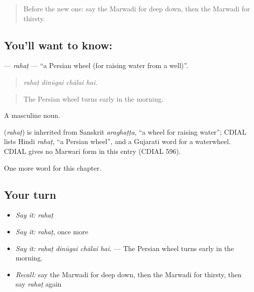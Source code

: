 \begin{quote}
Before the new one: say the Marwadi for deep down, then the Marwadi for thirsty.
\end{quote}

\subsection*{You'll want to know: }
\textbf{} — \emph{rahaṭ} — \textquotedblleft{}a Persian wheel (for raising water from a well)\textquotedblright{}.

\begin{quote}
   
\end{quote}

\begin{quote}
\emph{rahaṭ dinūgai chālai hai.}
\end{quote}

\begin{quote}
The Persian wheel turns early in the morning.
\end{quote}

A masculine noun.

\begin{cousinweb}
\textbf{} (\emph{rahaṭ}) is inherited from Sanskrit \emph{araghaṭṭa}, \textquotedblleft{}a wheel for raising water\textquotedblright{}; CDIAL lists Hindi \emph{rahaṭ}, \textquotedblleft{}a Persian wheel\textquotedblright{}, and a Gujarati word for a waterwheel. CDIAL gives no Marwari form in this entry (CDIAL 596).
\end{cousinweb}

\begin{grammarlens}[title={What you've built}]
One more word for this chapter.
\end{grammarlens}

\subsection*{Your turn}
\begin{itemize}
\raggedright
  \item \emph{Say it:} \emph{rahaṭ}
  \item \emph{Say it:} \emph{rahaṭ}, once more
  \item \emph{Say it:} \emph{rahaṭ dinūgai chālai hai.} — The Persian wheel turns early in the morning.
  \item \emph{Recall:} say the Marwadi for deep down, then the Marwadi for thirsty, then say \emph{rahaṭ} again
\end{itemize}

